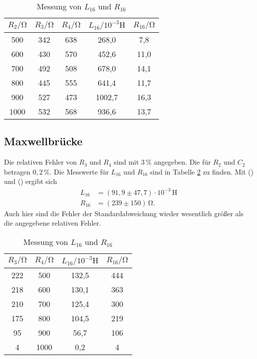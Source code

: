 \begin{table}
  \centering
  \caption{Messung von $L_{16}$ und $R_{16}$}
  \label{tab:Cx,Rx}
  \begin{tabular}{c c c c c}
    \toprule
    $R_2/\unit{\ohm}$ & $R_3/\unit{\ohm}$ & $R_4/\unit{\ohm}$ & $L_{16}/10^{-3}\unit{\henry}$ & $R_{16}/\unit{\ohm}$ \\
    \midrule
     500 & 342 & 638 &  268,0 &  7,8 \\
     600 & 430 & 570 &  452,6 & 11,0 \\
     700 & 492 & 508 &  678,0 & 14,1 \\
     800 & 445 & 555 &  641,4 & 11,7 \\
     900 & 527 & 473 & 1002,7 & 16,3 \\
    1000 & 532 & 568 &  936,6 & 13,7 \\
    \bottomrule
  \end{tabular}
\end{table}

\subsection{Maxwellbrücke}
Die relativen Fehler von $R_3$ und $R_4$ sind mit $3\,\% $ angegeben. Die für $R_2$ und $C_2$ betragen $0,2\,\%$.
Die Messwerte für $L_{16}$ und $R_{16}$ sind in Tabelle \ref{tab:Cx,Rx,Maxwell} zu finden. Mit () und () ergibt sich
\begin{align*}
  L_{16} &= (91,9 \pm 47,7)\cdot 10^{-3} \,\unit{\henry} \\
  R_{16} &= (239 \pm 150)\,\unit{\ohm}.
\end{align*}
Auch hier sind die Fehler der Standardabweichung wieder wesentlich größer als die angegebene relativen Fehler.

\begin{table}
  \centering
  \caption{Messung von $L_{16}$ und $R_{16}$}
  \label{tab:Cx,Rx,Maxwell}
  \begin{tabular}{c c c c}
    \toprule
    $R_3/\unit{\ohm}$ & $R_4/\unit{\ohm}$ & $L_{16}/10^{-3}\unit{\henry}$ & $R_{16}/\unit{\ohm}$ \\
    \midrule
    222 &  500 &  132,5 & 444 \\
    218 &  600 &  130,1 & 363 \\
    210 &  700 &  125,4 & 300 \\
    175 &  800 &  104,5 & 219 \\
     95 &  900 &   56,7 & 106 \\
      4 & 1000 &    0,2 &   4 \\
    \bottomrule
  \end{tabular}
\end{table}

